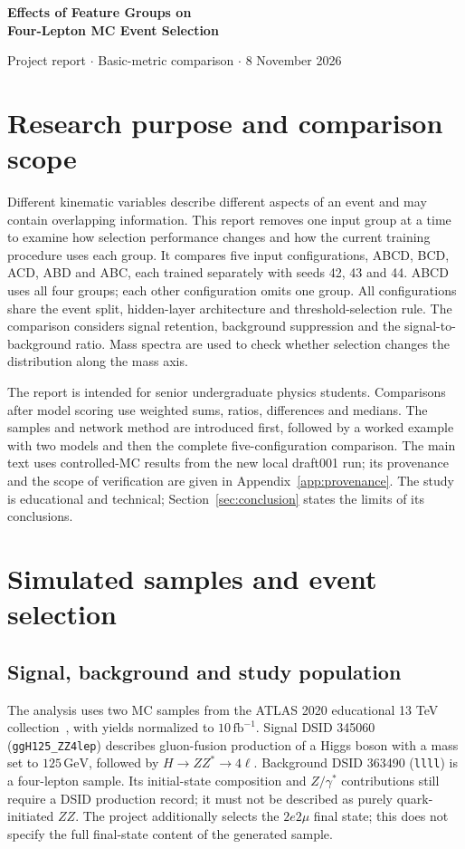 \documentclass[11pt,a4paper]{article}
\newcommand{\gev}{\,\mathrm{GeV}}
\begin{document}
{\LARGE\bfseries\color{reportblue} Effects of Feature Groups on\\ Four-Lepton MC Event Selection\par}
\vspace{6pt}
Project report $\cdot$ Basic-metric comparison $\cdot$ 8 November 2026

\section{Research purpose and comparison scope}

Different kinematic variables describe different aspects of an event and may contain overlapping information.
This report removes one input group at a time to examine how selection performance changes and how the current training procedure uses each group.
It compares five input configurations, ABCD, BCD, ACD, ABD and ABC, each trained separately with seeds 42, 43 and 44.
ABCD uses all four groups; each other configuration omits one group. All configurations share the event split, hidden-layer architecture and threshold-selection rule.
The comparison considers signal retention, background suppression and the signal-to-background ratio. Mass spectra are used to check whether selection changes the distribution along the mass axis.

The report is intended for senior undergraduate physics students. Comparisons after model scoring use weighted sums, ratios, differences and medians.
The samples and network method are introduced first, followed by a worked example with two models and then the complete five-configuration comparison.
The main text uses controlled-MC results from the new local draft001 run; its provenance and the scope of verification are given in Appendix~\ref{app:provenance}.
The study is educational and technical; Section~\ref{sec:conclusion} states the limits of its conclusions.

\section{Simulated samples and event selection}

\subsection{Signal, background and study population}
The analysis uses two MC samples from the ATLAS 2020 educational 13 TeV collection~\cite{OpenData}, with yields normalized to $10\,\mathrm{fb}^{-1}$.
Signal DSID 345060 (\texttt{ggH125\_ZZ4lep}) describes gluon-fusion production of a Higgs boson with a mass set to $125\gev$, followed by $H\to ZZ^*\to4\ell$.
Background DSID 363490 (\texttt{llll}) is a four-lepton sample. Its initial-state composition and $Z/\gamma^*$ contributions still require a DSID production record; it must not be described as purely quark-initiated $ZZ$.
The project additionally selects the $2e2\mu$ final state; this does not specify the full final-state content of the generated sample.
\end{document}
